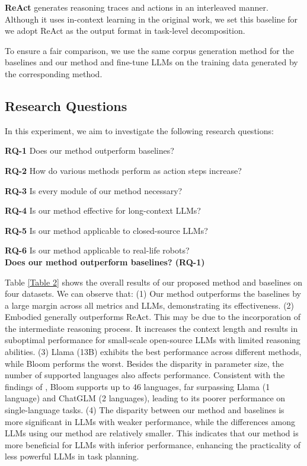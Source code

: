 \textbf{ReAct} \cite{DBLP:conf/iclr/YaoZYDSN023} generates reasoning traces and actions in an interleaved manner. Although it uses in-context learning in the original work, we set this baseline for we adopt ReAct as the output format in task-level decomposition. 

To ensure a fair comparison, we use the same corpus generation method for the baselines and our method and fine-tune LLMs on the training data generated by the corresponding method.

\subsection{Research Questions}

In this experiment, we aim to investigate the following research questions:

\textbf{RQ-1} Does our method outperform baselines?

\textbf{RQ-2} How do various methods perform as action steps increase?

\textbf{RQ-3} Is every module of our method necessary?

\textbf{RQ-4} Is our method effective for long-context LLMs?

\textbf{RQ-5} Is our method applicable to closed-source LLMs?

\textbf{RQ-6} Is our method applicable to real-life robots?\\

\noindent \textbf{Does our method outperform baselines? (RQ-1)}

Table \ref{Table 2} shows the overall results of our proposed method and baselines on four datasets. We can observe that: (1) Our method outperforms the baselines by a large margin across all metrics and LLMs, demonstrating its effectiveness. (2) Embodied generally outperforms ReAct. This may be due to the incorporation of the intermediate reasoning process. It increases the context length and results in suboptimal performance for small-scale open-source LLMs with limited reasoning abilities. (3) Llama (13B) exhibits the best performance across different methods, while Bloom performs the worst. Besides the disparity in parameter size, the number of supported languages also affects performance. Consistent with the findings of \cite{DBLP:conf/acl/ConneauKGCWGGOZ20,DBLP:journals/corr/abs-2311-10797}, Bloom supports up to 46 languages, far surpassing Llama (1 language) and ChatGLM (2 languages), leading to its poorer performance on single-language tasks. (4) The disparity between our method and baselines is more significant in LLMs with weaker performance, while the differences among LLMs using our method are relatively smaller. This indicates that our method is more beneficial for LLMs with inferior performance, enhancing the practicality of less powerful LLMs in task planning.

